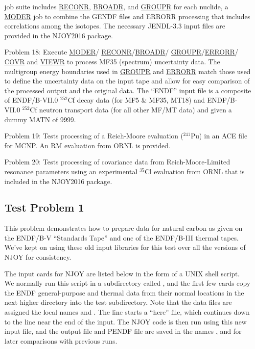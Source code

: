 \begin{description}
\begin{singlespace}
   job suite includes \hyperlink{sRECONRhy}{RECONR},
   \hyperlink{sBROADRhy}{BROADR}, and \hyperlink{sGROUPRhy}{GROUPR}
   for each nuclide, a \hyperlink{sMODERhy}{MODER} job to combine
   the GENDF files and ERRORR processing that includes correlations
   among the isotopes.  The necessary JENDL-3.3
   input files are provided in the NJOY2016 package.
\item[Problem 18:]  Execute \hyperlink{sMODERhy}{MODER}/
   \hyperlink{sRECONRhy}{RECONR}/\hyperlink{sBROADRhy}{BROADR}/
   \hyperlink{sGROUPRhy}{GROUPR}/\hyperlink{sERRORRhy}{ERRORR}/
   \hyperlink{sCOVRhy}{COVR} and \hyperlink{sVIEWRhy}{VIEWR}
   to process MF35 (spectrum) uncertainty data.  The multigroup
   energy boundaries used in \hyperlink{sGROUPRhy}{GROUPR}
   and \hyperlink{sERRORRhy}{ERRORR} match those
   used to define the uncertainty data on the input tape and allow
   for easy comparison of the processed output and the original data.
   The ``ENDF'' input file is a composite of ENDF/B-VII.0 $^{252}$Cf
   decay data (for MF5 \& MF35, MT18) and ENDF/B-VII.0 $^{252}$Cf
   neutron transport data (for all other MF/MT data) and given a
   dummy MATN of 9999.
\item[Problem 19:] Tests processing of a Reich-Moore evaluation
   ($^{241}$Pu) in an ACE file for MCNP.  An RM evaluation from ORNL
   is provided.
\item[Problem 20:] Tests processing of covariance data from
   Reich-Moore-Limited resonance parameters using an
   experimental $^{35}$Cl evaluation from ORNL that is included in
   the NJOY2016 package.
\end{singlespace}
\end{description}

\subsection{Test Problem 1}
\label{ssMandT_1}

This problem demonstrates how to prepare data for natural carbon
as given on the ENDF/B-V ``Standards Tape'' and one of the ENDF/B-III
thermal tapes.  We've kept on using these old input libraries
for this test over all the versions of NJOY for consistency.

The input cards for NJOY are listed below in the form of
a UNIX shell script.  We normally run this script in a subdirectory
called , and the  first few cards copy the
ENDF general-purpose and thermal data from their normal locations
in the next higher directory into the test subdirectory.  Note
that the data files are assigned the local names 
and .  The  line starts a ``here'' file,
which continues down to the  line near the end of
the input.  The NJOY code is then run using this new input file,
and the output file and PENDF file are saved in the names
 , and  for later comparisons
with previous runs.

